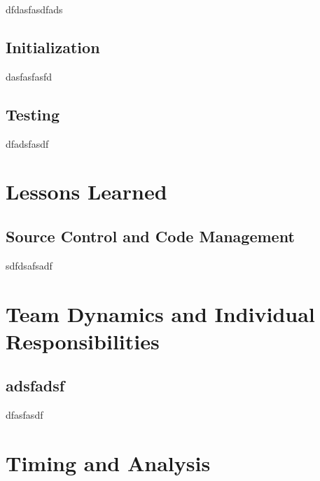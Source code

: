 \documentclass[12pt]{report}
\begin{document}
dfdasfasdfads

\section{Initialization}

dasfasfasfd

\section{Testing}

dfadsfasdf

\chapter{Lessons Learned}

\section{Source Control and Code Management}

sdfdsafsadf

\chapter{Team Dynamics and Individual Responsibilities}

\section{adsfadsf}

dfasfasdf

\chapter{Timing and Analysis}
\end{document}
